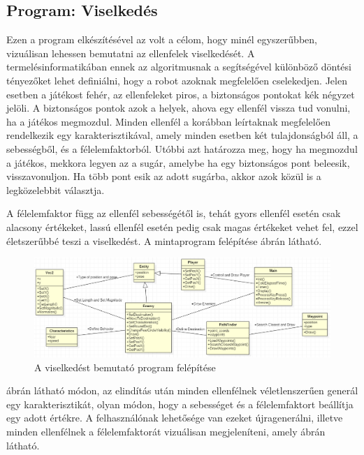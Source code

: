 \subsection{Program: Viselkedés}

Ezen a program elkészítésével az volt a célom, hogy minél egyszerűbben, vizuálisan lehessen bemutatni az ellenfelek viselkedését. A termelésinformatikában ennek az algoritmusnak a segítségével különböző döntési tényezőket lehet definiálni, hogy a robot azoknak megfelelően cselekedjen. Jelen esetben a játékost fehér, az ellenfeleket piros, a biztonságos pontokat kék négyzet jelöli. A biztonságos pontok azok a helyek, ahova egy ellenfél vissza tud vonulni, ha a játékos megmozdul. Minden ellenfél a korábban leírtaknak megfelelően rendelkezik egy karakterisztikával, amely minden esetben két tulajdonságból áll, a sebességből, és a félelemfaktorból. Utóbbi azt határozza meg, hogy ha megmozdul a játékos, mekkora legyen az a sugár, amelybe ha egy biztonságos pont beleesik, visszavonuljon. Ha több pont esik az adott sugárba, akkor azok közül is a legközelebbit választja.

A félelemfaktor függ az ellenfél sebességétől is, tehát gyors ellenfél esetén csak alacsony értékeket, lassú ellenfél esetén pedig csak magas értékeket vehet fel, ezzel életszerűbbé teszi a viselkedést. A mintaprogram felépítése  ábrán látható.

\begin{figure}[h]
\centering
\includegraphics[scale=0.5]{kepek/behavior_uml.png}
\caption{A viselkedést bemutató program felépítése}
\label{fig:behavior_uml}
\end{figure}

 ábrán látható módon, az elindítás után minden ellenfélnek véletlenszerűen generál egy karakterisztikát, olyan módon, hogy a sebességet és a félelemfaktort beállítja egy adott értékre. A felhasználónak lehetősége van ezeket újragenerálni, illetve minden ellenfélnek a félelemfaktorát vizuálisan megjeleníteni, amely  ábrán látható.

